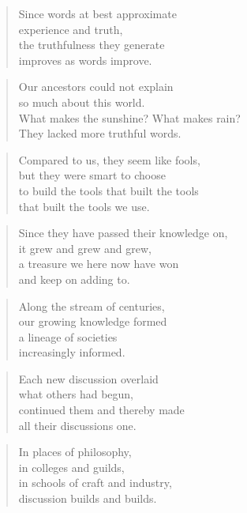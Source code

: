 \documentclass[10pt,a4paper]{article}
\begin{document}
\begin{multicols}{2}
\begin{verse}
Since words at best approximate\\
experience and truth,\\
the truthfulness they generate\\
improves as words improve.
\end{verse}

\begin{verse}
Our ancestors could not explain\\
so much about this world.\\
What makes the sunshine? What makes rain?\\
They lacked more truthful words.
\end{verse}

\begin{verse}
Compared to us, they seem like fools,\\
but they were smart to choose\\
to build the tools that built the tools\\
that built the tools we use.
\end{verse}

\begin{verse}
Since they have passed their knowledge on,\\
it grew and grew and grew,\\
a treasure we here now have won\\
and keep on adding to.
\end{verse}

\begin{verse}
Along the stream of centuries,\\
our growing knowledge formed\\
a lineage of societies\\
increasingly informed.
\end{verse}

\begin{verse}
Each new discussion overlaid\\
what others had begun,\\
continued them and thereby made\\
all their discussions one.
\end{verse}

\begin{verse}
In places of philosophy,\\
in colleges and guilds,\\
in schools of craft and industry,\\
discussion builds and builds.
\end{verse}


\end{multicols}
\end{document}
